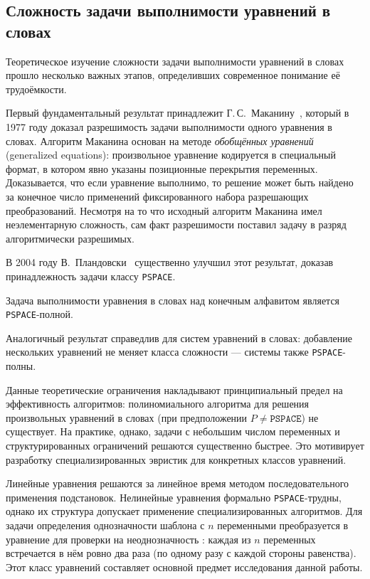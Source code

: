 \documentclass[14pt, russian]{scrartcl}
\begin{document}
\subsection{Сложность задачи выполнимости уравнений в словах}

Теоретическое изучение сложности задачи выполнимости уравнений в словах прошло
несколько важных этапов, определивших современное понимание её трудоёмкости.

Первый фундаментальный результат принадлежит Г.\,С.~Маканину~\cite{makanin1977},
который в 1977 году доказал разрешимость задачи выполнимости одного уравнения
в словах. Алгоритм Маканина основан на методе \textit{обобщённых уравнений}
(generalized equations): произвольное уравнение кодируется в специальный формат,
в котором явно указаны позиционные перекрытия переменных. Доказывается, что если
уравнение выполнимо, то решение может быть найдено за конечное число применений
фиксированного набора разрешающих преобразований. Несмотря на то что исходный
алгоритм Маканина имел неэлементарную сложность, сам факт разрешимости
поставил задачу в разряд алгоритмически разрешимых.

В 2004 году В.~Пландовски~\cite{plandowski2004} существенно улучшил этот результат,
доказав принадлежность задачи классу \texttt{PSPACE}.

\begin{Theorem}[Пландовски, 2004]
Задача выполнимости уравнения в словах над конечным алфавитом является
\texttt{PSPACE}-полной.
\end{Theorem}

Аналогичный результат справедлив для систем уравнений в словах: добавление
нескольких уравнений не меняет класса сложности --- системы также
\texttt{PSPACE}-полны.

Данные теоретические ограничения накладывают принципиальный предел на
эффективность алгоритмов: полиномиального алгоритма для решения произвольных
уравнений в словах (при предположении $P \neq \texttt{PSPACE}$) не существует.
На практике, однако, задачи с небольшим числом переменных и структурированных
ограничений решаются существенно быстрее. Это мотивирует разработку
специализированных эвристик для конкретных классов уравнений.

Линейные уравнения решаются за линейное время методом последовательного
применения подстановок. Нелинейные уравнения формально \texttt{PSPACE}-трудны,
однако их структура допускает применение специализированных алгоритмов.
Для задачи определения однозначности шаблона с $n$ переменными преобразуется в уравнение для проверки на
неоднозначность : каждая из $n$ переменных встречается
в нём ровно два раза (по одному разу с каждой стороны равенства).
Этот класс уравнений составляет основной предмет исследования данной работы.
\end{document}
